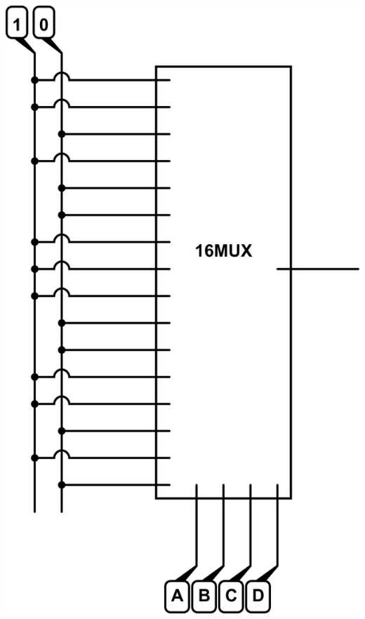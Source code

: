 \documentclass[10pt,twoside,a4paper]{article}
\begin{document}
\begin{enumerate}
\includegraphics[scale=0.4]{sv2-2-a.png} 


\end{enumerate}
\end{document}
